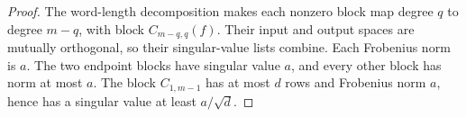 \begin{proof}
The word-length decomposition makes each nonzero block map degree $q$ to degree $m-q$, with block $C_{m-q,q}(f)$. Their input and output spaces are mutually orthogonal, so their singular-value lists combine. Each Frobenius norm is $a$. The two endpoint blocks have singular value $a$, and every other block has norm at most $a$. The block $C_{1,m-1}$ has at most $d$ rows and Frobenius norm $a$, hence has a singular value at least $a/\sqrt d$.
\end{proof}

